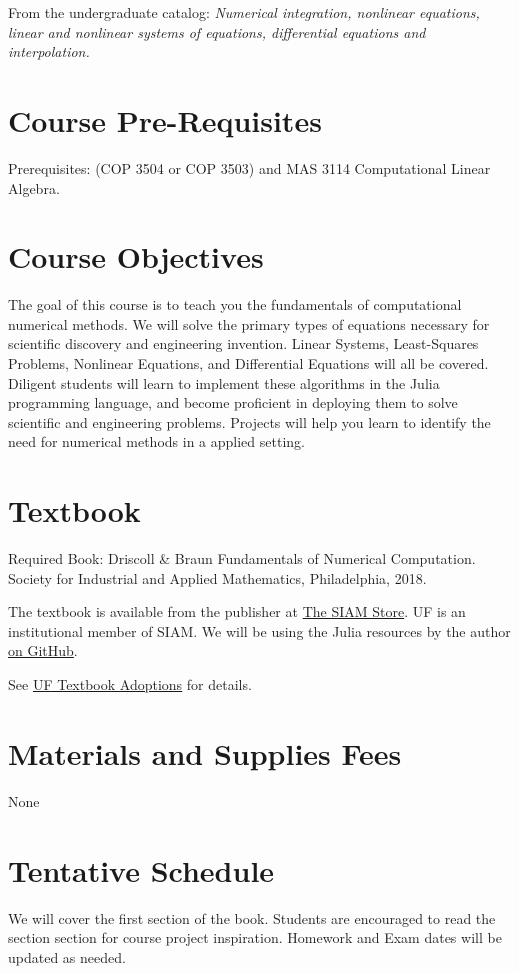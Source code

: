 \documentclass[11pt, article, oneside]{memoir}
\begin{document}
From the undergraduate catalog:
\emph{
Numerical integration, nonlinear equations, linear and nonlinear systems of equations, differential equations and interpolation.
}


\section{Course Pre-Requisites}
Prerequisites: (COP 3504 or COP 3503) and MAS 3114 Computational Linear Algebra.

\section{Course Objectives}

The goal of this course is to teach you the fundamentals of computational numerical methods. We will solve the primary types of equations necessary for scientific discovery and engineering invention. Linear Systems, Least-Squares Problems, Nonlinear Equations, and Differential Equations will all be covered. Diligent students will learn to implement these algorithms in the Julia programming language, and become proficient in deploying them to solve scientific and engineering problems. Projects will help you learn to identify the need for numerical methods in a applied setting.

\section{Textbook}

Required Book: Driscoll \& Braun Fundamentals of Numerical Computation. Society for Industrial and Applied Mathematics, Philadelphia, 2018.

The textbook is available from the publisher at \href{https://my.siam.org/Store/Product/viewproduct/?ProductId=29215528}{The SIAM Store}. UF is an institutional member of SIAM. We will be using the Julia resources by the author \href{https://github.com/tobydriscoll/FundamentalsNumericalComputation.jl}{on GitHub}.
 
See \href{https://www.bsd.ufl.edu/textadoption/Manage/ViewAnAdoption.aspx?adoptId=300159}{UF Textbook Adoptions} for details.
\section{Materials and Supplies Fees}
None
 
\section{Tentative Schedule}
We will cover the first section of the book. Students are encouraged to read the section section for course project inspiration. Homework and Exam dates will be updated as needed. 
\end{document}
